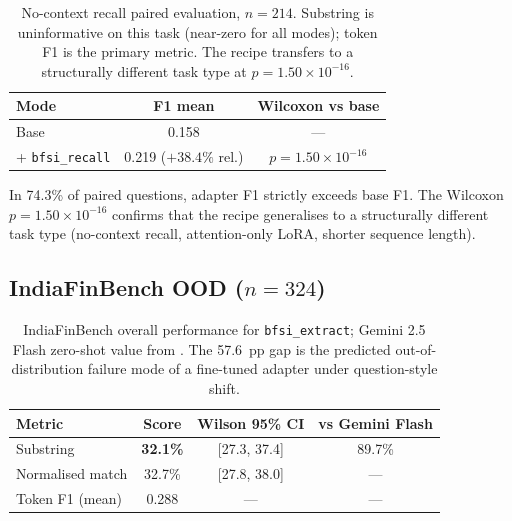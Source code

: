 \documentclass{article}
\begin{document}
\begin{table}[h]
  \caption{No-context recall paired evaluation, $n{=}214$. Substring is uninformative on this task (near-zero for all modes); token F1 is the primary metric. The recipe transfers to a structurally different task type at $p{=}1.50\times10^{-16}$.}
  \label{tab:recall}
  \centering
  \begin{tabular}{lcc}
    \toprule
    Mode & F1 mean & Wilcoxon vs base \\
    \midrule
    Base & 0.158 & --- \\
    + \texttt{bfsi\_recall} & 0.219 ($+38.4\%$ rel.) & $p{=}1.50\times10^{-16}$ \\
    \bottomrule
  \end{tabular}
\end{table}

In 74.3\% of paired questions, adapter F1 strictly exceeds base F1. The Wilcoxon $p{=}1.50\times10^{-16}$ confirms that the recipe generalises to a structurally different task type (no-context recall, attention-only LoRA, shorter sequence length).

\subsection{IndiaFinBench OOD ($n{=}324$)}

\begin{table}[h]
  \caption{IndiaFinBench overall performance for \texttt{bfsi\_extract}; Gemini 2.5 Flash zero-shot value from \citet{pall2026indiafinbench}. The 57.6~pp gap is the predicted out-of-distribution failure mode of a fine-tuned adapter under question-style shift.}
  \label{tab:indiafin-overall}
  \centering
  \begin{tabular}{lccc}
    \toprule
    Metric & Score & Wilson 95\% CI & vs Gemini Flash \\
    \midrule
    Substring & \textbf{32.1\%} & [27.3, 37.4] & 89.7\% \\
    Normalised match & 32.7\% & [27.8, 38.0] & --- \\
    Token F1 (mean) & 0.288 & --- & --- \\
    \bottomrule
  \end{tabular}
\end{table}
\end{document}
